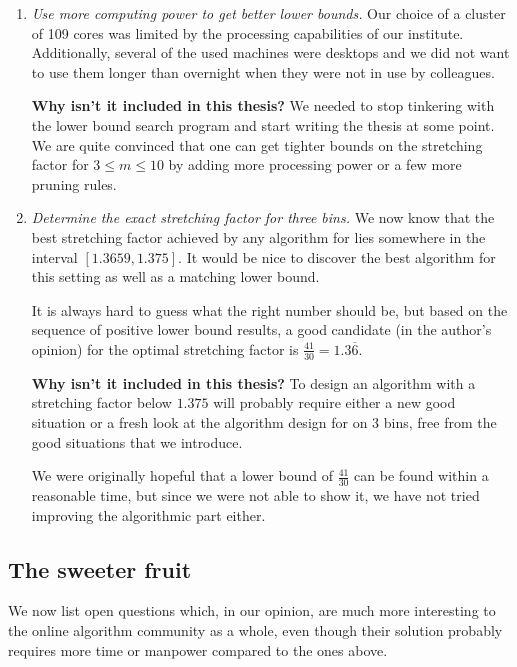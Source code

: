 \begin{enumerate}

\item \textit{Use more computing power to get better lower bounds.}
Our choice of a cluster of 109 cores was limited by the processing
capabilities of our institute. Additionally, several of the used
machines were desktops and we did not want to use them longer than
overnight when they were not in use by colleagues.

\noindent\textbf{Why isn't it included in this thesis?} We needed to stop
tinkering with the lower bound search program and start writing the
thesis at some point. We are quite convinced that one can get tighter
bounds on the stretching factor for $3 \le m \le 10$ by adding more
processing power or a few more pruning rules.

\item \textit{Determine the exact stretching factor for three bins.}
We now know that the best stretching factor achieved by any algorithm
for \binstretch lies somewhere in the interval $[1.3659,1.375]$. It
would be nice to discover the best algorithm for this setting as well
as a matching lower bound.

It is always hard to guess what the right number should be, but based
on the sequence of positive lower bound results, a good candidate (in
the author's opinion) for the optimal stretching factor is
$\frac{41}{30} = 1.3\overline{6}$.

\noindent\textbf{Why isn't it included in this thesis?} To design an
algorithm with a stretching factor below $1.375$ will probably require
either a new good situation or a fresh look at the algorithm design
for \binstretch on $3$ bins, free from the good situations that we
introduce.

We were originally hopeful that a lower bound of $\frac{41}{30}$ can
be found within a reasonable time, but since we were not able to show
it, we have not tried improving the algorithmic part either.
\end{enumerate}

\subsection{The sweeter fruit}

We now list open questions which, in our opinion, are much more
interesting to the online algorithm community as a whole, even though
their solution probably requires more time or manpower compared to the
ones above.

